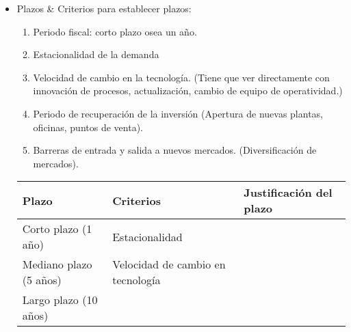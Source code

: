 \begin{itemize}
    \item Plazos \& Criterios para establecer plazos: 
        \begin{enumerate}
            \item Periodo fiscal: corto plazo osea un año.
            \item Estacionalidad de la demanda 
            \item Velocidad de cambio en la tecnología. (Tiene que ver directamente con innovación de procesos, actualización, cambio de equipo de operatividad.)
            \item Periodo de recuperación de la inversión (Apertura de nuevas plantas, oficinas, puntos de venta).
            \item Barreras de entrada y salida a nuevos mercados. (Diversificación de mercados).
        \end{enumerate}
        \begin{center}
           \begin{tabular}{ | p{5cm} | p{5cm} | p{5cm} | }
               \hline
                   Plazo & Criterios & Justificación del plazo     \\
               \hline
                    Corto plazo (1 año) & Estacionalidad & \\ 
                    Mediano plazo (5 años) & Velocidad de cambio en tecnología &  \\ 
                    Largo plazo (10 años) &  & \\ 
               \hline
           \end{tabular}
        \end{center}
\end{itemize}
